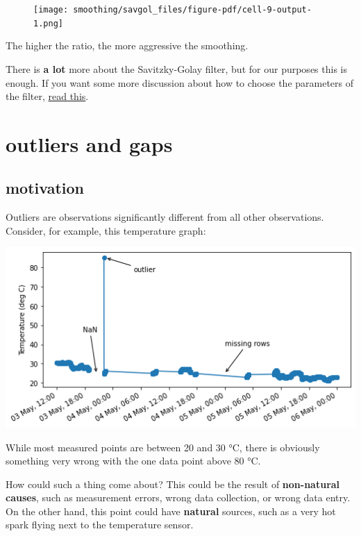 \documentclass[
  letterpaper,
  DIV=11,
  numbers=noendperiod,
  oneside]{scrreprt}
\begin{document}
\begin{figure}[H]

{\centering \texttt{[image: smoothing/savgol\_files/figure-pdf/cell-9-output-1.png]}

}

\end{figure}

The higher the ratio, the more aggressive the smoothing.

There is \textbf{a lot} more about the Savitzky-Golay filter, but for
our purposes this is enough. If you want some more discussion about how
to choose the parameters of the filter,
\href{https://nirpyresearch.com/savitzky-golay-smoothing-method/}{read
this}.

\part{outliers and gaps}

\hypertarget{motivation-2}{%
\chapter{motivation}\label{motivation-2}}

Outliers are observations significantly different from all other
observations. Consider, for example, this temperature graph:

\includegraphics{outliers/temp-outlier.png}

While most measured points are between 20 and 30 °C, there is obviously
something very wrong with the one data point above 80 °C.

How could such a thing come about? This could be the result of
\textbf{non-natural causes}, such as measurement errors, wrong data
collection, or wrong data entry. On the other hand, this point could
have \textbf{natural} sources, such as a very hot spark flying next to
the temperature sensor.
\end{document}
